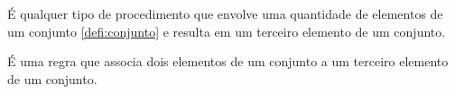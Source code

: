 \documentclass[../../main]{subfiles}
\begin{document}
    \begin{defi}\label{defi:operacao-matematica}
        É qualquer tipo de procedimento que envolve uma quantidade de elementos de um conjunto \ref{defi:conjunto} e resulta em um terceiro elemento de um conjunto.
    \end{defi}

    \begin{defi}\label{defi:operacao-binaria}
        É uma regra que associa dois elementos de um conjunto a um terceiro elemento de um conjunto.
    \end{defi}
\end{document}
